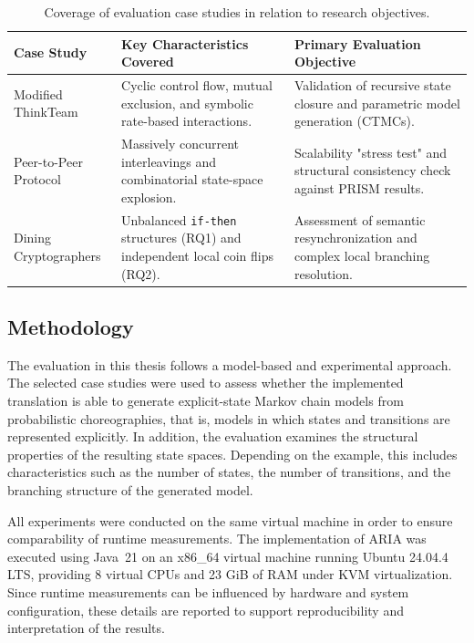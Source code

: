 \begin{table}[ht]
	\centering
	\caption{Coverage of evaluation case studies in relation to research objectives.}
	\label{tab:case-study-coverage}
	\begin{tabularx}{\textwidth}{l Y Y}
		\toprule
		\textbf{Case Study} & \textbf{Key Characteristics Covered} & \textbf{Primary Evaluation Objective} \\
		\midrule
		Modified ThinkTeam & Cyclic control flow, mutual exclusion, and symbolic rate-based interactions. & Validation of recursive state closure and parametric model generation (CTMCs). \\
		\addlinespace
		Peer-to-Peer Protocol & Massively concurrent interleavings and combinatorial state-space explosion. & Scalability "stress test" and structural consistency check against PRISM results. \\
		\addlinespace
		Dining Cryptographers & Unbalanced \texttt{if-then} structures (RQ1) and independent local coin flips (RQ2). & Assessment of semantic resynchronization and complex local branching resolution. \\
		\bottomrule
	\end{tabularx}
\end{table}

\subsection{Methodology}

The evaluation in this thesis follows a model-based and experimental approach. The selected case studies were used to assess whether the implemented translation is able to generate explicit-state Markov chain models from probabilistic choreographies, that is, models in which states and transitions are represented explicitly. In addition, the evaluation examines the structural properties of the resulting state spaces. Depending on the example, this includes characteristics such as the number of states, the number of transitions, and the branching structure of the generated model.

All experiments were conducted on the same virtual machine in order to ensure comparability of runtime measurements. The implementation of \textsc{ARIA} was executed using Java~21 on an x86\_64 virtual machine running Ubuntu 24.04.4 LTS, providing 8 virtual CPUs and 23 GiB of RAM under KVM virtualization. Since runtime measurements can be influenced by hardware and system configuration, these details are reported to support reproducibility and interpretation of the results.

